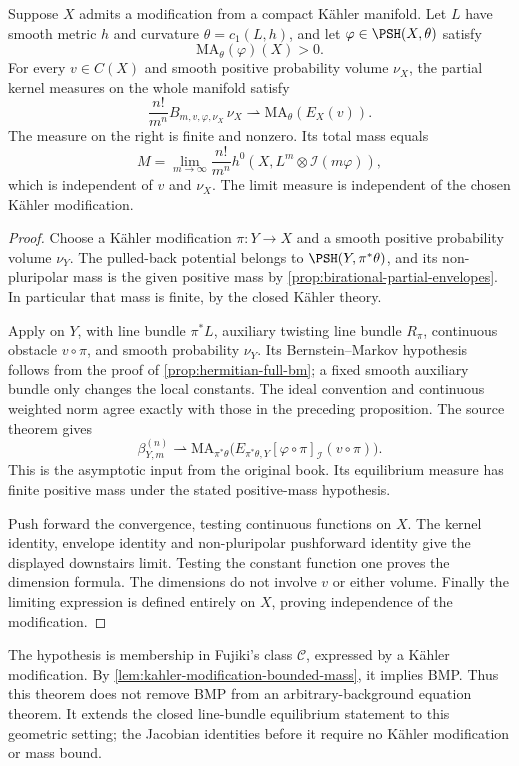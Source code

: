 \begin{theorem}\label{thm:fujiki-partial-kernel-limit}
Suppose $X$ admits a modification from a compact K\"ahler manifold. Let $L$ have smooth metric $h$ and curvature $\theta=c_1(L,h)$, and let $\varphi\in\PSH(X,\theta)$ satisfy
\[
 \mathrm{MA}_\theta(\varphi)(X)>0.
\]
For every $v\in C(X)$ and smooth positive probability volume $\nu_X$, the partial kernel measures on the whole manifold satisfy
\[
 \frac{n!}{m^n}B_{m,v,\varphi,\nu_X}\,\nu_X
       \rightharpoonup\mathrm{MA}_\theta(E_X(v)).
\]
The measure on the right is finite and nonzero. Its total mass equals
\[
 M=\lim_{m\to\infty}\frac{n!}{m^n}
                    h^0(X,L^m\otimes\mathcal I(m\varphi)),
\]
which is independent of $v$ and $\nu_X$. The limit measure is independent of the chosen K\"ahler modification.
\end{theorem}
\begin{proof}
Choose a K\"ahler modification $\pi:Y\to X$ and a smooth positive probability volume $\nu_Y$. The pulled-back potential belongs to $\PSH(Y,\pi^*\theta)$, and its non-pluripolar mass is the given positive mass by \cref{prop:birational-partial-envelopes}. In particular that mass is finite, by the closed K\"ahler theory.

Apply \cite[Theorem~14.3.1]{SGPT} on $Y$, with line bundle $\pi^*L$, auxiliary twisting line bundle $R_\pi$, continuous obstacle $v\circ\pi$, and smooth probability $\nu_Y$. Its Bernstein--Markov hypothesis follows from the proof of \cref{prop:hermitian-full-bm}; a fixed smooth auxiliary bundle only changes the local constants. The ideal convention and continuous weighted norm agree exactly with those in the preceding proposition. The source theorem gives
\[
 \beta_{Y,m}^{(n)}\rightharpoonup
 \mathrm{MA}_{\pi^*\theta}
 \bigl(E_{\pi^*\theta,Y}[\varphi\circ\pi]_{\mathcal I}(v\circ\pi)\bigr).
\]
This is the asymptotic input from the original book. Its equilibrium measure has finite positive mass under the stated positive-mass hypothesis.

Push forward the convergence, testing continuous functions on $X$. The kernel identity, envelope identity and non-pluripolar pushforward identity give the displayed downstairs limit. Testing the constant function one proves the dimension formula. The dimensions do not involve $v$ or either volume. Finally the limiting expression is defined entirely on $X$, proving independence of the modification.
\end{proof}

The hypothesis is membership in Fujiki's class $\mathcal C$, expressed by a K\"ahler modification. By \cref{lem:kahler-modification-bounded-mass}, it implies BMP. Thus this theorem does not remove BMP from an arbitrary-background equation theorem. It extends the closed line-bundle equilibrium statement to this geometric setting; the Jacobian identities before it require no K\"ahler modification or mass bound.


